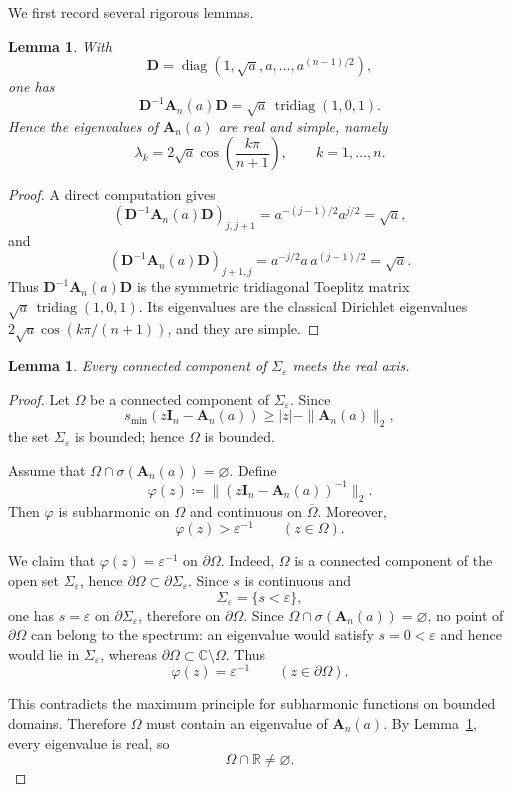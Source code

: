 \documentclass[11pt]{article}
\newtheorem{lemma}[theorem]{Lemma}
\begin{document}
We first record several rigorous lemmas.

\begin{lemma}\label{lem:real-spectrum}
With
\[
\mathbf D=\operatorname{diag}(1,\sqrt a,a,\dots,a^{(n-1)/2}),
\]
one has
\[
\mathbf D^{-1}\mathbf A_n(a)\mathbf D
=
\sqrt a\,\operatorname{tridiag}(1,0,1).
\]
Hence the eigenvalues of \(\mathbf A_n(a)\) are real and simple, namely
\[
\lambda_k
=
2\sqrt a\cos\!\left(\frac{k\pi}{n+1}\right),
\qquad
k=1,\dots,n.
\]
\end{lemma}

\begin{proof}
A direct computation gives
\[
(\mathbf D^{-1}\mathbf A_n(a)\mathbf D)_{j,j+1}
=
a^{-(j-1)/2}a^{j/2}
=
\sqrt a,
\]
and
\[
(\mathbf D^{-1}\mathbf A_n(a)\mathbf D)_{j+1,j}
=
a^{-j/2}a\,a^{(j-1)/2}
=
\sqrt a.
\]
Thus \(\mathbf D^{-1}\mathbf A_n(a)\mathbf D\) is the symmetric tridiagonal Toeplitz
matrix \(\sqrt a\,\operatorname{tridiag}(1,0,1)\). Its eigenvalues are the classical Dirichlet
eigenvalues \(2\sqrt a\cos(k\pi/(n+1))\), and they are simple.
\end{proof}

\begin{lemma}\label{lem:real-axis}
Every connected component of \(\Sigma_\varepsilon\) meets the real axis.
\end{lemma}

\begin{proof}
Let \(\Omega\) be a connected component of \(\Sigma_\varepsilon\).
Since
\[
s_{\min}(z\mathbf I_n-\mathbf A_n(a))\ge |z|-\|\mathbf A_n(a)\|_2,
\]
the set \(\Sigma_\varepsilon\) is bounded; hence \(\Omega\) is bounded.

Assume that \(\Omega\cap\sigma(\mathbf A_n(a))=\varnothing\).
Define
\[
\varphi(z)\coloneqq \|(z\mathbf I_n-\mathbf A_n(a))^{-1}\|_2.
\]
Then \(\varphi\) is subharmonic on \(\Omega\) and continuous on \(\overline\Omega\).  Moreover,
\[
\varphi(z)>\varepsilon^{-1}
\qquad (z\in\Omega).
\]

We claim that \(\varphi(z)=\varepsilon^{-1}\) on \(\partial\Omega\).  Indeed, \(\Omega\) is a connected component of the open set \(\Sigma_\varepsilon\), hence \(\partial\Omega\subset \partial\Sigma_\varepsilon\). Since \(s\) is continuous and
\[
\Sigma_\varepsilon=\{s<\varepsilon\},
\]
one has \(s=\varepsilon\) on \(\partial\Sigma_\varepsilon\), therefore on \(\partial\Omega\). Since \(\Omega\cap\sigma(\mathbf A_n(a))=\varnothing\), no point of \(\partial\Omega\) can belong to the spectrum: an eigenvalue would satisfy \(s=0<\varepsilon\) and hence would lie in \(\Sigma_\varepsilon\), whereas \(\partial\Omega\subset \mathbb C\setminus \Omega\). Thus
\[
\varphi(z)=\varepsilon^{-1}
\qquad (z\in\partial\Omega).
\]

This contradicts the maximum principle for subharmonic functions on bounded domains. Therefore \(\Omega\) must contain an eigenvalue of \(\mathbf A_n(a)\). By Lemma~\ref{lem:real-spectrum}, every eigenvalue is real, so
\[
\Omega\cap\mathbb R\neq\varnothing.
\]
\end{proof}
\end{document}
